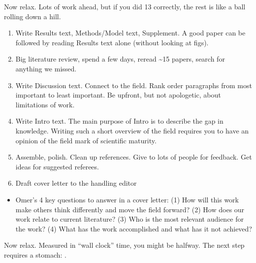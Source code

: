 \documentclass[letterpaper,10pt,english]{sphinxmanual}
\begin{document}
\sphinxAtStartPar
Now relax. Lots of work ahead, but if you did 1\sphinxhyphen{}3 correctly, the rest is like a ball rolling down a hill.
\begin{enumerate}
%
\setcounter{enumi}{3}
\item {} 
\sphinxAtStartPar
Write Results text, Methods/Model text, Supplement. A good paper can be followed by reading Results text alone (without looking at figs).

\item {} 
\sphinxAtStartPar
Big literature review, spend a few days, re\sphinxhyphen{}read \textasciitilde{}15 papers, search for anything we missed.

\item {} 
\sphinxAtStartPar
Write Discussion text. Connect to the field. Rank order paragraphs from most important to least important. Be upfront, but not apologetic, about limitations of work.

\item {} 
\sphinxAtStartPar
Write Intro text. The main purpose of Intro is to describe the gap in knowledge. Writing such a short overview of the field requires you to have an opinion of the field \textendash{} mark of scientific maturity.

\item {} 
\sphinxAtStartPar
Assemble, polish. Clean up references. Give to lots of people for feedback. Get ideas for suggested referees.

\item {} 
\sphinxAtStartPar
Draft cover letter to the handling editor

\end{enumerate}
\begin{itemize}
\item {} 
\sphinxAtStartPar
Omer’s 4 key questions to answer in a cover letter: (1) How will this work make others think differently and move the field forward? (2) How does our work relate to current literature? (3) Who is the most relevant audience for the work? (4) What has the work accomplished and what has it not achieved?

\end{itemize}

\sphinxAtStartPar
Now relax. Measured in “wall clock” time, you might be halfway. The next step requires a stomach: {\hyperref[\detokenize{OldEmails:receiving-reviews}]{}}.
\end{document}
